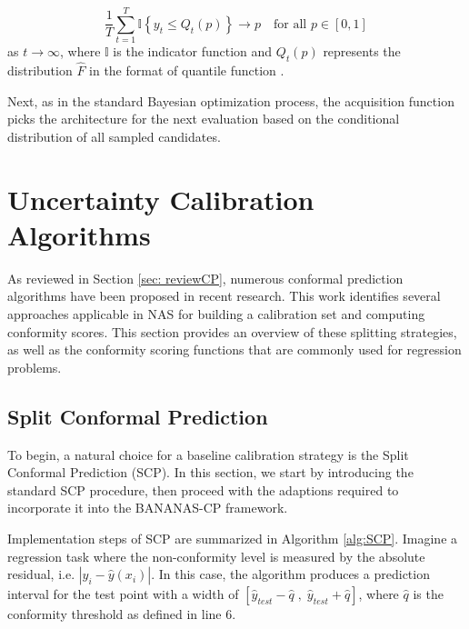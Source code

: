 \documentclass[a4paper,oneside,bibliography=totoc]{scrbook}
\begin{document}
{{\begin{equation}
\frac{1}{T} \sum_{t=1}^{T} \mathbb{I} \left\{ y_t \leq Q_t(p) \right\} \rightarrow p \quad \text{for all } p \in [0,1]
\end{equation}
as $t \rightarrow \infty$, where $\mathbb{I}$ is the indicator function and $Q_t(p)$ represents the distribution $\hat{F}$ in the format of quantile function \cite{deshpande2024online, pmlr-v80-kuleshov18a}. 

Next, as in the standard  Bayesian optimization process, the acquisition function picks the architecture for the next evaluation based on the conditional distribution of all sampled candidates.

\section{Uncertainty Calibration Algorithms}
\label{sec:cp}
As reviewed in Section \ref{sec: reviewCP}, numerous conformal prediction algorithms have been proposed in recent research. This work identifies several approaches applicable in NAS for building a calibration set and computing conformity scores. This section provides an overview of these splitting strategies, as well as the conformity scoring functions that are commonly used for regression problems.
\subsection{Split Conformal Prediction}
\label{sec:scp}
To begin, a natural choice for a baseline calibration strategy is the Split Conformal Prediction (SCP). In this section, we start by introducing the standard SCP procedure, then proceed with the adaptions required to incorporate it into the BANANAS-CP framework. 

Implementation steps of SCP are summarized in Algorithm \ref{alg:SCP}. Imagine a regression task where the non-conformity level is measured by the absolute residual, i.e. $|y_i - \hat{y}(x_i)|$. In this case, the algorithm produces a prediction interval for the test point with a width of $\left[\hat{y}_{test} - \hat{q}\;,\; \hat{y}_{test} + \hat{q}\right]$, where $\hat{q}$ is the conformity threshold as defined in line 6.

}}
\end{document}
